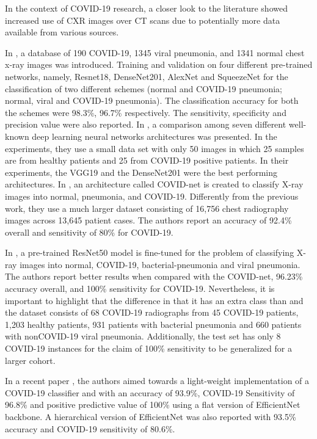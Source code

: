 In the context of COVID-19 research, a closer look to the literature showed increased use of CXR images over CT scans due to potentially more data available from various sources. 

In \cite{chowdhury2020can}, a database  of 190 COVID-19, 1345 viral pneumonia, and 1341 normal chest x-ray images was introduced. Training and validation on four different pre-trained networks, namely, Resnet18, DenseNet201, AlexNet and SqueezeNet for the classification of two different schemes (normal and COVID-19 pneumonia; normal, viral and COVID-19 pneumonia). The classification accuracy for both the schemes were 98.3\%, 96.7\% respectively. The sensitivity, specificity and precision value were also reported. In \cite{hemdan2020covidx}, a comparison among seven different well-known deep learning neural networks architectures was presented. In the experiments, they use a small data set with only 50 images in which 25 samples are from healthy patients and 25 from COVID-19 positive patients. In their experiments, the VGG19 and the DenseNet201 were the best performing architectures. In \cite{wang2020covid}, an architecture called COVID-net is created to classify X-ray images into normal, pneumonia, and COVID-19. Differently from the previous work, they use a much larger dataset consisting of 16,756 chest radiography images across 13,645 patient cases. The authors report an accuracy of 92.4\% overall and sensitivity of 80\% for COVID-19.
 
In \cite{farooq2020covid}, a pre-trained ResNet50 model is fine-tuned for the problem of classifying X-ray images into normal, COVID-19, bacterial-pneumonia and viral pneumonia. The authors report better results when compared with the COVID-net, 96.23\% accuracy overall, and 100\% sensitivity for COVID-19. Nevertheless, it is important to highlight that the difference in \cite{farooq2020covid} that it has an extra class than \cite{wang2020covid} and the dataset consists of 68 COVID-19 radiographs from 45 COVID-19 patients, 1,203 healthy patients, 931 patients with bacterial pneumonia and 660 patients with nonCOVID-19 viral pneumonia. Additionally, the test set has only 8 COVID-19 instances for the claim of 100\% sensitivity to be generalized for a larger cohort.    
 
 In a recent paper \cite{luz2020efficient}, the authors aimed towards a light-weight implementation of a COVID-19 classifier and with an accuracy of 93.9\%, COVID-19 Sensitivity of 96.8\% and positive
predictive value of 100\%  using a flat version of EfficientNet backbone. A hierarchical version of EfficientNet was also reported with 93.5\% accuracy and COVID-19 sensitivity of 80.6\%. 


